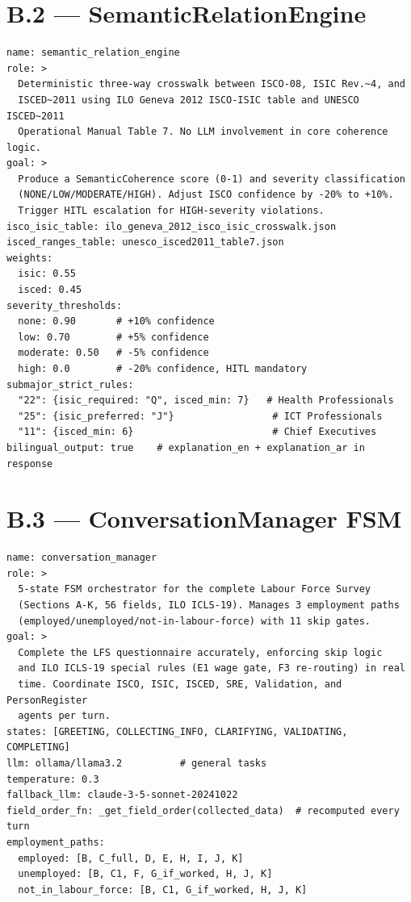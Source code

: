 \section*{B.2 --- SemanticRelationEngine}
\begin{lstlisting}[breaklines=true,caption={SemanticRelationEngine configuration.}]
name: semantic_relation_engine
role: >
  Deterministic three-way crosswalk between ISCO-08, ISIC Rev.~4, and
  ISCED~2011 using ILO Geneva 2012 ISCO-ISIC table and UNESCO ISCED~2011
  Operational Manual Table 7. No LLM involvement in core coherence logic.
goal: >
  Produce a SemanticCoherence score (0-1) and severity classification
  (NONE/LOW/MODERATE/HIGH). Adjust ISCO confidence by -20% to +10%.
  Trigger HITL escalation for HIGH-severity violations.
isco_isic_table: ilo_geneva_2012_isco_isic_crosswalk.json
isced_ranges_table: unesco_isced2011_table7.json
weights:
  isic: 0.55
  isced: 0.45
severity_thresholds:
  none: 0.90       # +10% confidence
  low: 0.70        # +5% confidence
  moderate: 0.50   # -5% confidence
  high: 0.0        # -20% confidence, HITL mandatory
submajor_strict_rules:
  "22": {isic_required: "Q", isced_min: 7}   # Health Professionals
  "25": {isic_preferred: "J"}                 # ICT Professionals
  "11": {isced_min: 6}                        # Chief Executives
bilingual_output: true    # explanation_en + explanation_ar in response
\end{lstlisting}

\section*{B.3 --- ConversationManager FSM}
\begin{lstlisting}[breaklines=true,caption={ConversationManager FSM configuration.}]
name: conversation_manager
role: >
  5-state FSM orchestrator for the complete Labour Force Survey
  (Sections A-K, 56 fields, ILO ICLS-19). Manages 3 employment paths
  (employed/unemployed/not-in-labour-force) with 11 skip gates.
goal: >
  Complete the LFS questionnaire accurately, enforcing skip logic
  and ILO ICLS-19 special rules (E1 wage gate, F3 re-routing) in real
  time. Coordinate ISCO, ISIC, ISCED, SRE, Validation, and PersonRegister
  agents per turn.
states: [GREETING, COLLECTING_INFO, CLARIFYING, VALIDATING, COMPLETING]
llm: ollama/llama3.2          # general tasks
temperature: 0.3
fallback_llm: claude-3-5-sonnet-20241022
field_order_fn: _get_field_order(collected_data)  # recomputed every turn
employment_paths:
  employed: [B, C_full, D, E, H, I, J, K]
  unemployed: [B, C1, F, G_if_worked, H, J, K]
  not_in_labour_force: [B, C1, G_if_worked, H, J, K]
\end{lstlisting}

